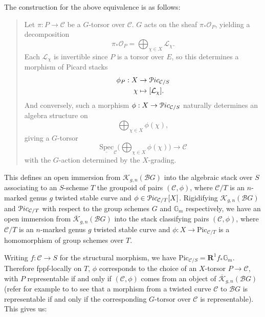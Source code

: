 \documentclass[11pt]{amsart}
\theoremstyle{definition}
\begin{document}
The construction for the above equivalence is as follows:
\begin{quotation}
  Let $\pi:P \rightarrow {\mathcal{C}}$ be a $G$-torsor over ${\mathcal{C}}$. $G$ acts on the sheaf $\pi_* {\mathcal{O}}_P$, yielding a decomposition 
\begin{displaymath}
\pi_* {\mathcal{O}}_P = \bigoplus_{\chi \in X} {\mathcal{L}}_\chi.
\end{displaymath}
Each ${\mathcal{L}}_\chi$ is invertible since $P$ is a torsor over $E$, so this determines a morphism of Picard stacks
\begin{align*}
\phi_P: X & \rightarrow {\mathbf{\EuScript{P}}}ic_{{\mathcal{C}}/S} \\
\chi & \mapsto [{\mathcal{L}}_\chi].
\end{align*}
And conversely, such a morphism $\phi: X \rightarrow {\mathbf{\EuScript{P}}}ic_{{\mathcal{C}}/S}$ naturally determines an algebra structure on 
\begin{displaymath}
\bigoplus_{\chi \in X} \phi(\chi),
\end{displaymath}
giving a $G$-torsor 
\begin{displaymath}
\underline{\mathrm{Spec}}_{\mathcal{C}} \big( \bigoplus_{\chi \in X} \phi(\chi) \big) \rightarrow {\mathcal{C}}
\end{displaymath}
with the $G$-action determined by the $X$-grading.
\end{quotation}
This defines an open immersion from ${\mathcal{K}}_{g,n}({\mathcal{B}} G)$ into the algebraic stack over $S$ associating to an $S$-scheme $T$ the groupoid of pairs $({\mathcal{C}},\phi)$, where ${\mathcal{C}}/T$ is an $n$-marked genus $g$ twisted stable curve and $\phi \in {\mathbf{\EuScript{P}}}ic_{{\mathcal{C}}/T}[X]$. Rigidifying ${\mathcal{K}}_{g,n}({\mathcal{B}} G)$ and ${\mathbf{\EuScript{P}}}ic_{{\mathcal{C}}/T}$ with respect to the group schemes $G$ and $\mathbb{G}_m$ respectively, we have an open immersion from $\overline{\mathcal{K}}_{g,n}({\mathcal{B}} G)$ into the stack classifying pairs $({\mathcal{C}},\phi)$, where ${\mathcal{C}}/T$ is an $n$-marked genus $g$ twisted stable curve and $\phi: X \rightarrow \mathrm{Pic}_{{\mathcal{C}}/T}$ is a homomorphism of group schemes over $T$.

Writing $f:{\mathcal{C}}\rightarrow S$ for the structural morphism, we have $\mathrm{Pic}_{{\mathcal{C}}/S} = \mathbf{R}^1 f_* \mathbb{G}_m$. Therefore fppf-locally on $T$, $\phi$ corresponds to the choice of an $X$-torsor $P \rightarrow {\mathcal{C}}$, with $P$ representable if and only if $({\mathcal{C}},\phi)$ comes from an object of $\overline{\mathcal{K}}_{g,n}({\mathcal{B}} G)$ (refer for example to \cite[2.3.10]{AH} to see that a morphism from a twisted curve ${\mathcal{C}}$ to ${\mathcal{B}} G$ is representable if and only if the corresponding $G$-torsor over ${\mathcal{C}}$ is representable). This gives us:
\end{document}
